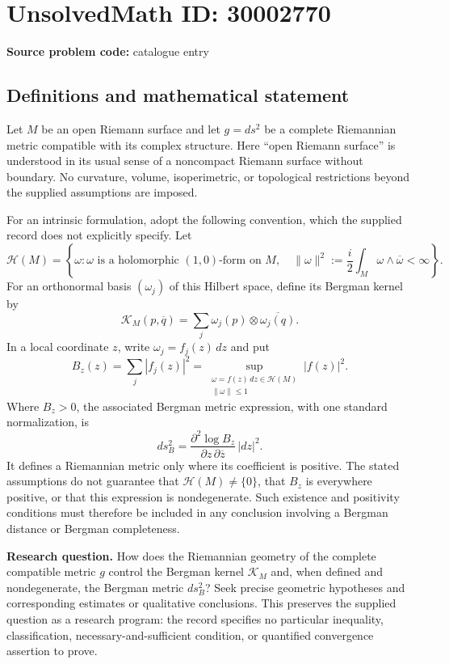 \documentclass[11pt]{article}
\begin{document}
\section*{UnsolvedMath ID: 30002770}
\textbf{Source problem code:} catalogue entry
\subsection{Definitions and mathematical statement}
Let \(M\) be an open Riemann surface and let \(g=ds^2\) be a complete Riemannian metric compatible with its complex structure. Here ``open Riemann surface'' is understood in its usual sense of a noncompact Riemann surface without boundary. No curvature, volume, isoperimetric, or topological restrictions beyond the supplied assumptions are imposed.

For an intrinsic formulation, adopt the following convention, which the supplied record does not explicitly specify. Let
\[
\mathcal H(M)=\left\{\omega:\omega\text{ is a holomorphic }(1,0)\text{-form on }M,\quad \|\omega\|^2:=\frac{i}{2}\int_M\omega\wedge\overline\omega<\infty\right\}.
\]
For an orthonormal basis \((\omega_j)\) of this Hilbert space, define its Bergman kernel by
\[
\mathcal K_M(p,\overline q)=\sum_j\omega_j(p)\otimes\overline{\omega_j(q)}.
\]
In a local coordinate \(z\), write \(\omega_j=f_j(z)\,dz\) and put
\[
B_z(z)=\sum_j|f_j(z)|^2
=\sup_{\substack{\omega=f(z)\,dz\in\mathcal H(M)\\\|\omega\|\leq1}}|f(z)|^2.
\]
Where \(B_z>0\), the associated Bergman metric expression, with one standard normalization, is
\[
ds_B^2=\frac{\partial^2\log B_z}{\partial z\,\partial\overline z}\,|dz|^2.
\]
It defines a Riemannian metric only where its coefficient is positive. The stated assumptions do not guarantee that \(\mathcal H(M)\neq\{0\}\), that \(B_z\) is everywhere positive, or that this expression is nondegenerate. Such existence and positivity conditions must therefore be included in any conclusion involving a Bergman distance or Bergman completeness.

\textbf{Research question.} How does the Riemannian geometry of the complete compatible metric \(g\) control the Bergman kernel \(\mathcal K_M\) and, when defined and nondegenerate, the Bergman metric \(ds_B^2\)? Seek precise geometric hypotheses and corresponding estimates or qualitative conclusions. This preserves the supplied question as a research program: the record specifies no particular inequality, classification, necessary-and-sufficient condition, or quantified convergence assertion to prove.
\end{document}
